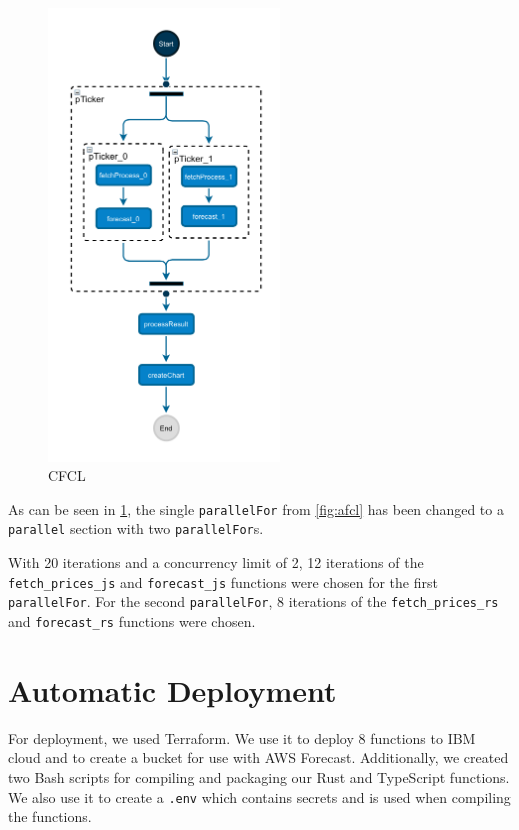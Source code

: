 \begin{figure}[h]
  \centering
  \includegraphics[height=12cm, keepaspectratio]{./assets/cfcl}
  \caption{CFCL}
  \label{fig:cfcl}
\end{figure}

As can be seen in \cref{fig:cfcl}, the single \texttt{parallelFor} from \cref{fig:afcl} has
been changed to a \texttt{parallel} section with two \texttt{parallelFor}s.

With 20 iterations and a concurrency limit of 2, 12 iterations of the \texttt{fetch\_prices\_js} and \texttt{forecast\_js}
functions were chosen for the first \texttt{parallelFor}. For the second \texttt{parallelFor},
8 iterations of the \texttt{fetch\_prices\_rs} and \texttt{forecast\_rs} functions were chosen.




%
%
%
\section{Automatic Deployment}

For deployment, we used Terraform. We use it to deploy 8 functions to IBM cloud and
to create a bucket for use with AWS Forecast. Additionally, we created two Bash scripts
for compiling and packaging our Rust and TypeScript functions. We also use it to create
a \texttt{.env} which contains secrets and is used when compiling the functions.



